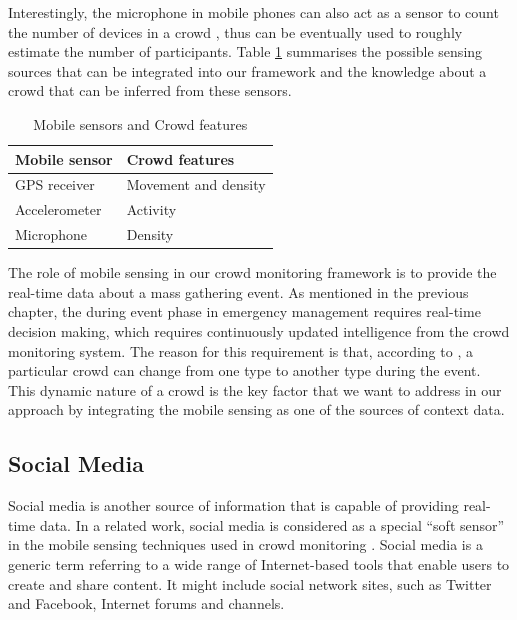 Interestingly, the microphone in mobile phones can also act as a sensor to count the number of devices in a crowd \citep{Kannan2012, Xu2013}, thus can be eventually used to roughly estimate the number of participants. Table \ref{table:mobileSensingCrowdFeature} summarises the possible sensing sources that can be integrated into our framework and the knowledge about a crowd that can be inferred from these sensors.

\begin{table}
	\caption{Mobile sensors and Crowd features}
	\label{table:mobileSensingCrowdFeature}
	\centering
	\begin{tabular}{|l|l|}
		\hline
		\textbf{Mobile sensor} & \textbf{Crowd features} \\
		\hline
		GPS receiver & Movement and density \\
		\hline
		Accelerometer & Activity \\
		\hline
		Microphone & Density \\
		\hline
	\end{tabular}
\end{table}

The role of mobile sensing in our crowd monitoring framework is to provide the real-time data about a mass gathering event. As mentioned in the previous chapter, the during event phase in emergency management requires real-time decision making, which requires continuously updated intelligence from the crowd monitoring system. The reason for this requirement is that, according to \citet{Berlonghi1995}, a particular crowd can change from one type to another type during the event. This dynamic nature of a crowd is the key factor that we want to address in our approach by integrating the mobile sensing as one of the sources of context data.

\subsection{Social Media}

Social media is another source of information that is capable of providing real-time data. In a related work, social media is considered as a special ``soft sensor'' in the mobile sensing techniques used in crowd monitoring \citep{Ramesh2014}. Social media is a generic term referring to a wide range of Internet-based tools that enable users to create and share content. It might include social network sites, such as Twitter and Facebook, Internet forums and channels.

